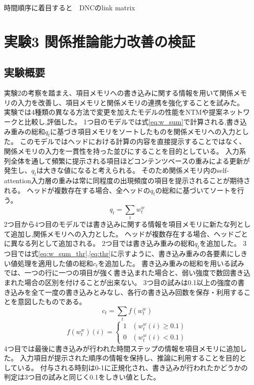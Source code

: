 時間順序に着目すると　DNCのlink matrix

\section{実験3 関係推論能力改善の検証}
\subsection{実験概要}
実験2の考察を踏まえ、項目メモリへの書き込みに関する情報を用いて関係メモリの入力を改善し、項目メモリと関係メモリの連携を強化することを試みた。
実験では4種類の異なる方法で変更を加えたモデルの性能をNTMや提案ネットワークと比較し,評価した。
1つ目のモデルでは式\ref{eq:w_sum}で計算される,書き込み重みの総和$q_t$に基づき項目メモリをソートしたものを関係メモリへの入力とした。
このモデルではヘッドにおける計算の内容を直接提示することではなく、関係メモリの入力を一貫性を持った並びにすることを目的としている。
入力系列全体を通して頻繁に提示される項目ほどコンテンツベースの重みによる更新が発生し、$q_t$は大きな値になると考えられる。
そのため関係メモリ内のself-attention入力層の重みは常に同程度の出現頻度の項目を提示されることが期待される。
ヘッドが複数存在する場合、全ヘッドの$q_t$の総和に基づいてソートを行う。
\begin{equation}\label{eq:w_sum}
	q_t=\sum_t{w^w_t}
\end{equation}
2つ目から4つ目のモデルでは書き込みに関する情報を項目メモリに新たな列として追加し,関係メモリへの入力とした。
ヘッドが複数存在する場合、ヘッドごとに異なる列として追加される。
2つ目では書き込み重みの総和$q_t$を追加した。
3つ目では式\ref{eq:w_sum_thr},\ref{eq:thr}に示すように、書き込み重みの各要素にしきい値処理を適用した値の総和$c_t$を追加した。
書き込み重みの総和を用いる試みでは、一つの行に一つの項目が強く書き込まれた場合と、弱い強度で数回書き込まれた場合の区別を付けることが出来ない。
3つ目の試みは0.1以上の強度の書き込みを全て一度の書き込みとみなし、各行の書き込み回数を保存・利用することを意図したものである。
\begin{equation}\label{eq:w_sum_thr}
	c_t=\sum_tf(w^w_t)
\end{equation}
\begin{equation}\label{eq:thr}
	f(w^w_t)(i)=
	\begin{cases}
	1 & (w^w_t(i) \geq 0.1)\\
	0 & (w^w_t(i) < 0.1)
	\end{cases}
\end{equation}
4つ目では最後に書き込みが行われた時間ステップの情報を項目メモリに追加した。
入力項目が提示された順序の情報を保持し、推論に利用することを目的としている。
付与される時刻は0-1に正規化され、書き込みが行われたかどうかの判定は3つ目の試みと同じく0.1をしきい値とした。

